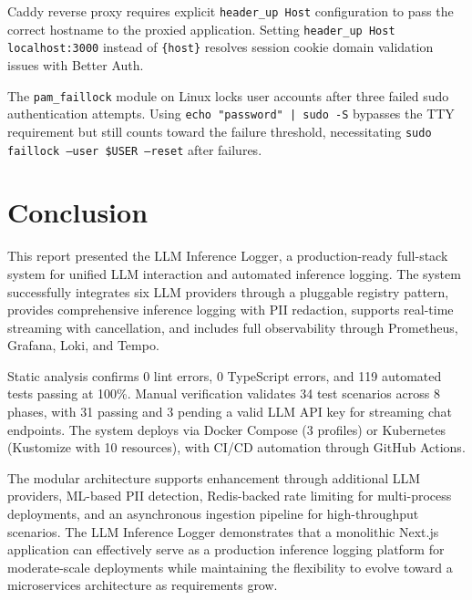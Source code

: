 \documentclass[conference]{IEEEtran}
\begin{document}
Caddy reverse proxy requires explicit \texttt{header\_up Host} configuration to pass the correct hostname to the proxied application. Setting \texttt{header\_up Host localhost:3000} instead of \texttt{\{host\}} resolves session cookie domain validation issues with Better Auth.

The \texttt{pam\_faillock} module on Linux locks user accounts after three failed sudo authentication attempts. Using \texttt{echo "password" | sudo -S} bypasses the TTY requirement but still counts toward the failure threshold, necessitating \texttt{sudo faillock --user \$USER --reset} after failures.

\section{Conclusion}

This report presented the LLM Inference Logger, a production-ready full-stack system for unified LLM interaction and automated inference logging. The system successfully integrates six LLM providers through a pluggable registry pattern, provides comprehensive inference logging with PII redaction, supports real-time streaming with cancellation, and includes full observability through Prometheus, Grafana, Loki, and Tempo.

Static analysis confirms 0 lint errors, 0 TypeScript errors, and 119 automated tests passing at 100\%. Manual verification validates 34 test scenarios across 8 phases, with 31 passing and 3 pending a valid LLM API key for streaming chat endpoints. The system deploys via Docker Compose (3 profiles) or Kubernetes (Kustomize with 10 resources), with CI/CD automation through GitHub Actions.

The modular architecture supports enhancement through additional LLM providers, ML-based PII detection, Redis-backed rate limiting for multi-process deployments, and an asynchronous ingestion pipeline for high-throughput scenarios. The LLM Inference Logger demonstrates that a monolithic Next.js application can effectively serve as a production inference logging platform for moderate-scale deployments while maintaining the flexibility to evolve toward a microservices architecture as requirements grow.
\end{document}
